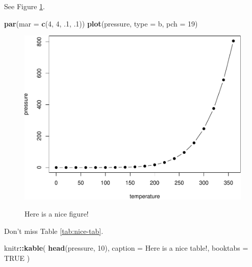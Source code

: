 \documentclass[
  20pt,
]{book}
\newenvironment{Shaded}{\begin{snugshade}}{\end{snugshade}}
\newcommand{\AttributeTok}[1]{\textcolor[rgb]{0.13,0.29,0.53}{#1}}
\newcommand{\ConstantTok}[1]{\textcolor[rgb]{0.56,0.35,0.01}{#1}}
\newcommand{\DecValTok}[1]{\textcolor[rgb]{0.00,0.00,0.81}{#1}}
\newcommand{\FunctionTok}[1]{\textcolor[rgb]{0.13,0.29,0.53}{\textbf{#1}}}
\newcommand{\NormalTok}[1]{#1}
\newcommand{\SpecialCharTok}[1]{\textcolor[rgb]{0.81,0.36,0.00}{\textbf{#1}}}
\newcommand{\StringTok}[1]{\textcolor[rgb]{0.31,0.60,0.02}{#1}}
\theoremstyle{definition}
\theoremstyle{definition}
\theoremstyle{definition}
\theoremstyle{definition}
\theoremstyle{remark}
\begin{document}
See Figure \ref{fig:nice-fig}.

\begin{Shaded}
\begin{Highlighting}[]
\FunctionTok{par}\NormalTok{(}\AttributeTok{mar =} \FunctionTok{c}\NormalTok{(}\DecValTok{4}\NormalTok{, }\DecValTok{4}\NormalTok{, .}\DecValTok{1}\NormalTok{, .}\DecValTok{1}\NormalTok{))}
\FunctionTok{plot}\NormalTok{(pressure, }\AttributeTok{type =} \StringTok{\textquotesingle{}b\textquotesingle{}}\NormalTok{, }\AttributeTok{pch =} \DecValTok{19}\NormalTok{)}
\end{Highlighting}
\end{Shaded}

\begin{figure}

{\centering \includegraphics[width=0.8\linewidth,alt={Plot with connected points showing that vapor pressure of mercury increases exponentially as temperature increases.}]{Extremales_files/figure-latex/nice-fig-1} 

}

\caption{Here is a nice figure!}\label{fig:nice-fig}
\end{figure}

Don't miss Table \ref{tab:nice-tab}.

\begin{Shaded}
\begin{Highlighting}[]
\NormalTok{knitr}\SpecialCharTok{::}\FunctionTok{kable}\NormalTok{(}
  \FunctionTok{head}\NormalTok{(pressure, }\DecValTok{10}\NormalTok{), }\AttributeTok{caption =} \StringTok{\textquotesingle{}Here is a nice table!\textquotesingle{}}\NormalTok{,}
  \AttributeTok{booktabs =} \ConstantTok{TRUE}
\NormalTok{)}
\end{Highlighting}
\end{Shaded}
\end{document}
